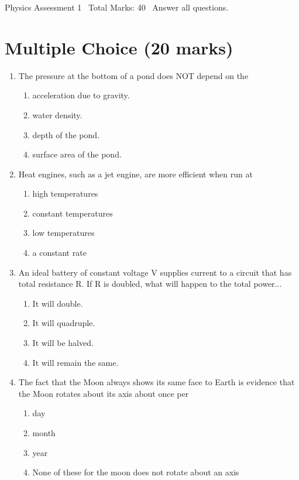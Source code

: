 \documentclass[12pt]{article}
\begin{document}
\begin{center}
Physics Assessment 1 \
Total Marks: 40 \
Answer all questions.
\end{center}

\section*{Multiple Choice (20 marks)}
\begin{enumerate}[label=\arabic*.]
\item The pressure at the bottom of a pond does NOT depend on the
\begin{enumerate}[label=(\alph*)]
    \item acceleration due to gravity.
    \item water density.
    \item depth of the pond.
    \item surface area of the pond.
\end{enumerate}
\item Heat engines, such as a jet engine, are more efficient when run at
\begin{enumerate}[label=(\alph*)]
    \item high temperatures
    \item constant temperatures
    \item low temperatures
    \item a constant rate
\end{enumerate}
\item An ideal battery of constant voltage V supplies current to a circuit that has total resistance R. If R is doubled, what will happen to the total power...
\begin{enumerate}[label=(\alph*)]
    \item It will double.
    \item It will quadruple.
    \item It will be halved.
    \item It will remain the same.
\end{enumerate}
\item The fact that the Moon always shows its same face to Earth is evidence that the Moon rotates about its axis about once per
\begin{enumerate}[label=(\alph*)]
    \item day
    \item month
    \item year
    \item None of these for the moon does not rotate about an axis

\end{enumerate}
\end{enumerate}
\end{document}
